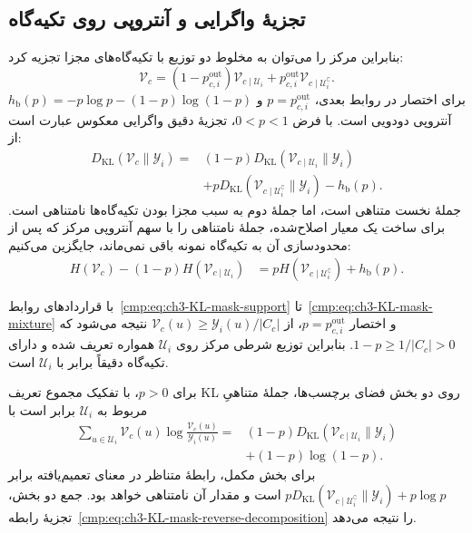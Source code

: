 \subsection{تجزیهٔ واگرایی و آنتروپی روی تکیه‌گاه}
بنابراین مرکز را می‌توان به مخلوط دو توزیع با
تکیه‌گاه‌های مجزا تجزیه کرد:
\begin{equation}\label{cmp:eq:ch3-KL-mask-mixture}
\mathcal V_c=(1-p_{c,i}^{\mathrm{out}})\mathcal V_{c\mid\mathcal U_i}
+p_{c,i}^{\mathrm{out}}\mathcal V_{c\mid\mathcal U_i^{\complement}}.
\end{equation}
برای اختصار در روابط بعدی، $p=p_{c,i}^{\mathrm{out}}$ و
$h_{\mathrm b}(p)=-p\log p-(1-p)\log(1-p)$
آنتروپی دودویی است. با فرض $0<p<1$، تجزیهٔ دقیق
واگرایی معکوس عبارت است از:
\begin{equation}\label{cmp:eq:ch3-KL-mask-reverse-decomposition}
\begin{aligned}
D_{\mathrm{KL}}(\mathcal V_c\|\mathscr Y_i)
={}&(1-p)D_{\mathrm{KL}}(\mathcal V_{c\mid\mathcal U_i}\|\mathscr Y_i)\\
&+pD_{\mathrm{KL}}(\mathcal V_{c\mid\mathcal U_i^{\complement}}\|\mathscr Y_i)
-h_{\mathrm b}(p).
\end{aligned}
\end{equation}
جملهٔ نخست متناهی است، اما جملهٔ دوم به سبب مجزا بودن
تکیه‌گاه‌ها نامتناهی است. برای ساخت یک معیار اصلاح‌شده،
جملهٔ نامتناهی را با سهم آنتروپی مرکز که پس از
محدودسازی آن به تکیه‌گاه نمونه باقی نمی‌ماند،
جایگزین می‌کنیم:
\begin{equation}\label{cmp:eq:ch3-KL-mask-entropy-replacement}
\begin{aligned}
H(\mathcal V_c)-(1-p)H(\mathcal V_{c\mid\mathcal U_i})
&=pH(\mathcal V_{c\mid\mathcal U_i^{\complement}})
+h_{\mathrm b}(p).
\end{aligned}
\end{equation}


با قراردادهای روابط~\eqref{cmp:eq:ch3-KL-mask-support}
تا~\eqref{cmp:eq:ch3-KL-mask-mixture} و اختصار
$p=p_{c,i}^{\mathrm{out}}$، از
$\mathcal V_c(u)\ge \mathscr Y_i(u)/|C_c|$ نتیجه می‌شود
که $1-p\ge 1/|C_c|>0$. بنابراین توزیع شرطی مرکز روی
$\mathcal U_i$ همواره تعریف شده و دارای تکیه‌گاه
دقیقاً برابر با $\mathcal U_i$ است.

برای $p>0$، با تفکیک مجموع تعریف KL روی دو بخش
فضای برچسب‌ها، جملهٔ متناهیِ مربوط به $\mathcal U_i$
برابر است با
\[
\begin{aligned}
\sum_{u\in\mathcal U_i}\mathcal V_c(u)
\log\frac{\mathcal V_c(u)}{\mathscr Y_i(u)}
={}&(1-p)D_{\mathrm{KL}}(\mathcal V_{c\mid\mathcal U_i}\|\mathscr Y_i)\\
&+(1-p)\log(1-p).
\end{aligned}
\]
برای بخش مکمل، رابطهٔ متناظر در معنای تعمیم‌یافته
برابر $pD_{\mathrm{KL}}(\mathcal V_{c\mid\mathcal U_i^{\complement}}
\|\mathscr Y_i)+p\log p$ است و مقدار آن نامتناهی
خواهد بود. جمع دو بخش، تجزیهٔ
رابطه~\eqref{cmp:eq:ch3-KL-mask-reverse-decomposition}
را نتیجه می‌دهد.

